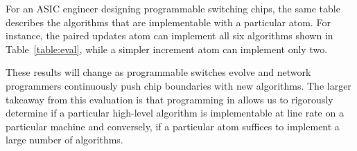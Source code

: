 For an ASIC engineer designing programmable switching chips, the same table
describes the algorithms that are implementable with a particular atom. For
instance, the paired updates atom can implement all six algorithms shown in
Table~\ref{table:eval}, while a simpler increment atom can implement only
two.

These results will change as programmable switches evolve and network
programmers continuously push chip boundaries with new algorithms.  The larger
takeaway from this evaluation is that programming in \pktlanguage allows us to
rigorously determine if a particular high-level algorithm is implementable at
line rate on a particular \absmachine machine and conversely, if a particular
atom suffices to implement a large number of algorithms.
